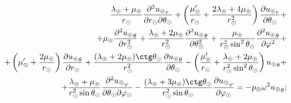\begin{equation*}
\begin{split}
\frac{\lambda_\circledcirc+\mu_\circledcirc}{r_\odot}\frac{\partial^2 {u_\circledcirc}_r}{\partial r_\odot \partial \theta_\odot} + \left(\frac{\mu_\circledcirc'}{r_\odot}+\frac{2\lambda_\circledcirc+4\mu_\circledcirc}{r_\odot^2}\right)\frac{\partial {u_\circledcirc}_r}{\partial \theta_\odot} + \\
+ \mu_\circledcirc \frac{\partial^2 {u_\circledcirc}_\theta}{\partial r_\odot^2} + \frac{\lambda_\circledcirc+2\mu_\circledcirc}{r_\odot^2}\frac{\partial^2 {u_\circledcirc}_\theta}{\partial \theta_\odot^2} + \frac{\mu_\circledcirc}{r_\odot^2\sin^2\theta_\odot} \frac{\partial^2 {u_\circledcirc}_\theta}{\partial \varphi^2} + \\
+ \left(\mu_\circledcirc'+ \frac{2\mu_\circledcirc}{r_\odot}\right)\frac{\partial {u_\circledcirc}_\theta}{\partial r_\odot} + \frac{(\lambda_\circledcirc+2\mu_\circledcirc)\ctg\theta_\odot}{r_\odot^2}\frac{\partial{u_\circledcirc}_\theta}{\partial \theta_\odot}-\left(\frac{\mu_\circledcirc'}{r_\odot} + \frac{\lambda_\circledcirc+2\mu_\circledcirc}{r_\odot^2\sin^2\theta_\odot}\right){u_\circledcirc}_\theta + \\
+ \frac{\lambda_\circledcirc+\mu_\circledcirc}{r_\odot^2\sin\theta_\odot}\frac{\partial^2{u_\circledcirc}_\varphi}{\partial \theta_\odot \partial \varphi_\odot} - \frac{(\lambda_\circledcirc+3\mu_\circledcirc)\ctg\theta_\odot}{r_\odot^2\sin\theta_\odot}\frac{\partial {u_\circledcirc}_\varphi}{\partial \varphi_\odot}  = -p_\circledcirc\omega^2{u_\circledcirc}_\theta;
\end{split}
\end{equation*}

